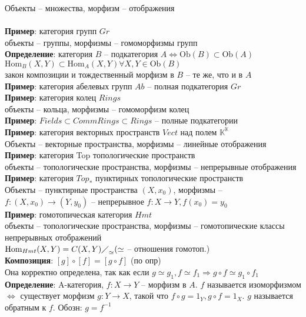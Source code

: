 	Объекты -- множества, морфизм -- отображения\\
	\\
	\textbf{Пример}: категория групп $Gr$\\
	объекты -- группы, морфизмы -- гомоморфизмы групп\\
	\textbf{Определение}: категория $B$ -- подкатегория $A \Leftrightarrow \text{Ob}(B) \subset \text{Ob}(A)$\\
	$\text{Hom}_B (X,Y) \subset \text{Hom}_A (X,Y) \forall X,Y \in \text{Ob}(B)$\\
	закон композиции и тождественный морфизм в $B$ -- те же, что и в $A$
	\\
	\textbf{Пример}: категория абелевых групп $Ab$ -- полная подкатегория $Gr$\\
	\textbf{Пример}: категория колец $Rings$\\
	объекты -- кольца, морфизмы -- гомоморфизм колец\\
	\textbf{Пример}: $Fields \subset Comm Rings \subset Rings$ -- полные подкатегории\\
	\textbf{Пример}: категория векторных пространств $Vect$ над полем $\mathbb{K}^{\mathbb{K}}$\\
	Объекты -- векторные пространства, морфизмы -- линейные отображения\\
	\textbf{Пример}: категория Top топологические пространств\\
	объекты -- топологические пространства, морфизмы -- непрерывные отображения\\
	\textbf{Пример}: категория $Top_{\ast}$ пунктирных топологические пространств\\
	Объекты -- пунктирные пространства $(X,x_0)$, морфизмы -- $f: (X,x_0) \rightarrow (Y,y_0)$ -- непрерывное $f: X\rightarrow Y, f(x_0) = y_0$\\
	\textbf{Пример}: гомотопическая категория $Hmt$\\
	объекты -- топологические пространства, морфизмы -- гомотопические классы непрерывных отображений\\
	$\text{Hom}_{Hmt} (X,Y) = {C(X,Y)\diagup}_{\simeq} (\simeq$ -- отношения гомотоп.)\\
	\textbf{Композиция}: $[g] \circ [f] = [g \circ f]$ (по опр)\\
	Она корректно определена, так как если $g \simeq g_1, f\simeq f_1 \Rightarrow g \circ f \simeq g_1 \circ f_1$\\
	\textbf{Определение}: A-категория, $f: X\rightarrow Y$ -- морфизм в $A$. $f$ называется изоморфизмом $\Leftrightarrow$ существует морфизм $g: Y\rightarrow X$, такой что $f \circ g = 1_Y, g \circ f = 1_X$. $g$ называется обратным к $f$. Обозн: $g = f^{-1}$\\

